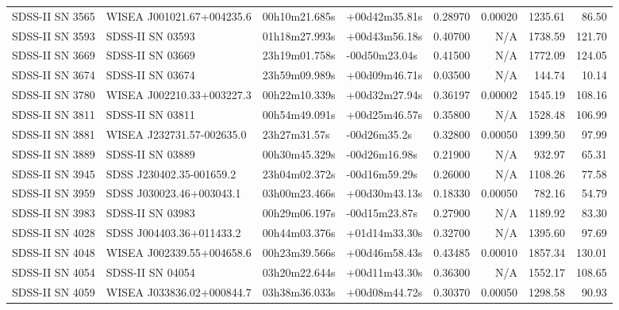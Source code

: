 \begin{longtable}{llllrrrr}
SDSS-II SN 3565  &       WISEA J001021.67+004235.6 &   00h10m21.685s &   +00d42m35.81s &  0.28970 &  0.00020 &  1235.61 &       86.50 \\
SDSS-II SN 3593  &                SDSS-II SN 03593 &   01h18m27.993s &   +00d43m56.18s &  0.40700 &      N/A &  1738.59 &      121.70 \\
SDSS-II SN 3669  &                SDSS-II SN 03669 &   23h19m01.758s &   -00d50m23.04s &  0.41500 &      N/A &  1772.09 &      124.05 \\
SDSS-II SN 3674  &                SDSS-II SN 03674 &   23h59m09.989s &   +00d09m46.71s &  0.03500 &      N/A &   144.74 &       10.14 \\
SDSS-II SN 3780  &       WISEA J002210.33+003227.3 &   00h22m10.339s &   +00d32m27.94s &  0.36197 &  0.00002 &  1545.19 &      108.16 \\
SDSS-II SN 3811  &                SDSS-II SN 03811 &   00h54m49.091s &   +00d25m46.57s &  0.35800 &      N/A &  1528.48 &      106.99 \\
SDSS-II SN 3881  &       WISEA J232731.57-002635.0 &    23h27m31.57s &    -00d26m35.2s &  0.32800 &  0.00050 &  1399.50 &       97.99 \\
SDSS-II SN 3889  &                SDSS-II SN 03889 &   00h30m45.329s &   -00d26m16.98s &  0.21900 &      N/A &   932.97 &       65.31 \\
SDSS-II SN 3945  &        SDSS J230402.35-001659.2 &   23h04m02.372s &   -00d16m59.29s &  0.26000 &      N/A &  1108.26 &       77.58 \\
SDSS-II SN 3959  &        SDSS J030023.46+003043.1 &   03h00m23.466s &   +00d30m43.13s &  0.18330 &  0.00050 &   782.16 &       54.79 \\
SDSS-II SN 3983  &                SDSS-II SN 03983 &   00h29m06.197s &   -00d15m23.87s &  0.27900 &      N/A &  1189.92 &       83.30 \\
SDSS-II SN 4028  &        SDSS J004403.36+011433.2 &   00h44m03.376s &   +01d14m33.30s &  0.32700 &      N/A &  1395.60 &       97.69 \\
SDSS-II SN 4048  &       WISEA J002339.55+004658.6 &   00h23m39.566s &   +00d46m58.43s &  0.43485 &  0.00010 &  1857.34 &      130.01 \\
SDSS-II SN 4054  &                SDSS-II SN 04054 &   03h20m22.644s &   +00d11m43.30s &  0.36300 &      N/A &  1552.17 &      108.65 \\
SDSS-II SN 4059  &       WISEA J033836.02+000844.7 &   03h38m36.033s &   +00d08m44.72s &  0.30370 &  0.00050 &  1298.58 &       90.93 \\

\end{longtable}
